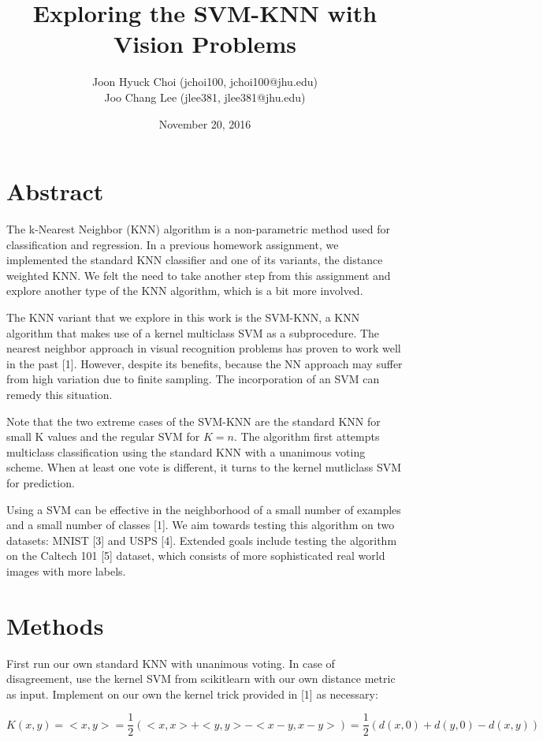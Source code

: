 \documentclass[11pt]{article}
\title{Exploring the SVM-KNN with Vision Problems}
\author{Joon Hyuck Choi (jchoi100, jchoi100@jhu.edu)\\Joo Chang Lee (jlee381, jlee381@jhu.edu)}
\date{November 20, 2016}
\begin{document}
\maketitle

\section{Abstract}
The k-Nearest Neighbor (KNN) algorithm is a non-parametric method used for classification and regression. In a previous homework assignment, we implemented the standard KNN classifier and one of its variants, the distance weighted KNN. We felt the need to take another step from this assignment and explore another type of the KNN algorithm, which is a bit more involved.

The KNN variant that we explore in this work is the SVM-KNN, a KNN algorithm that makes use of a kernel multiclass SVM as a subprocedure. The nearest neighbor approach in visual recognition problems has proven to work well in the past [1]. However, despite its benefits, because the NN approach may suffer from high variation  due to finite sampling. The incorporation of an SVM can remedy this situation.

Note that the two extreme cases of the SVM-KNN are the standard KNN for small K values and the regular SVM for $K = n$. The algorithm first attempts multiclass classification using the standard KNN with a unanimous voting scheme. When at least one vote is different, it turns to the kernel mutliclass SVM for prediction.

Using a SVM can be effective in the neighborhood of a small number of examples and a small number of classes [1]. We aim towards testing this algorithm on two datasets: MNIST [3] and USPS [4]. Extended goals include testing the algorithm on the Caltech 101 [5] dataset, which consists of more sophisticated real world images with more labels.

\section{Methods}

First run our own standard KNN with unanimous voting. In case of disagreement, use the kernel SVM from scikitlearn with our own distance metric as input.  Implement on our own the kernel trick provided in [1] as necessary: 

$$K(x,y)=<x,y>=\frac{1}{2}(<x,x>+<y,y>-<x-y,x-y>)=\frac{1}{2}(d(x,0)+d(y,0)-d(x,y))$$
\end{document}
